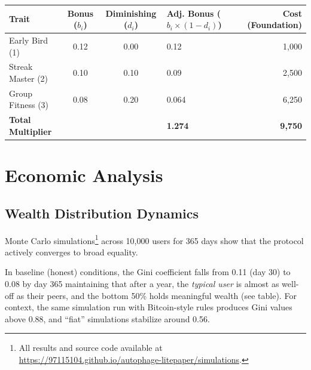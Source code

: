 \documentclass[11pt,letterpaper]{article}
\begin{document}
\begin{table}[H]
\small
\centering
\begin{tabular}{p{3cm} c c p{2.2cm} r}
\toprule
\textbf{Trait} & \textbf{Bonus ($b_i$)} & \textbf{Diminishing ($d_i$)} & \textbf{Adj. Bonus ($b_i \times (1-d_i)$)} & \textbf{Cost (Foundation)} \\
\midrule
Early Bird (1)    & 0.12 & 0.00 & 0.12        & 1,000 \\
Streak Master (2) & 0.10 & 0.10 & 0.09        & 2,500 \\
Group Fitness (3) & 0.08 & 0.20 & 0.064       & 6,250 \\
\midrule
\textbf{Total Multiplier} &&& \textbf{1.274} & \textbf{9,750} \\
\bottomrule
\end{tabular}
\end{table}

\section{Economic Analysis}

\subsection{Wealth Distribution Dynamics}

Monte Carlo simulations\footnote{All results and source code available at \url{https://97115104.github.io/autophage-litepaper/simulations}.} across 10,000 users for 365 days show that the protocol actively converges to broad equality. 

In baseline (honest) conditions, the Gini coefficient falls from 0.11 (day 30) to 0.08 by day 365 maintaining that after a year, the \emph{typical user} is almost as well-off as their peers, and the bottom 50\% holds meaningful wealth (see table). For context, the same simulation run with Bitcoin-style rules produces Gini values above 0.88, and ``fiat'' simulations stabilize around 0.56.
\end{document}
